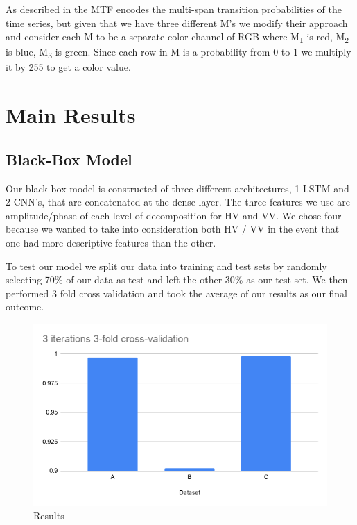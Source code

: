 \documentclass{turabian-thesis}
\begin{document}
As described in \cite{wang_encoding_nodate} the MTF encodes the multi-span transition probabilities of the time series, but given that we have three different M's we modify their approach and consider each M to be a separate color channel of RGB where M\textsubscript{1} is red, M\textsubscript{2} is blue, M\textsubscript{3} is green. Since each row in M is a probability from 0 to 1 we multiply it by 255 to get a color value.

\chapter{Main Results}
\label{chap:results}

\section{Black-Box Model}
Our black-box model is constructed of three different architectures, 1 LSTM and 2 CNN’s, that are concatenated at the dense layer. The three features we use are amplitude/phase of each level of decomposition for HV and VV. We chose four because we wanted to take into consideration both HV / VV in the event that one had more descriptive features than the other.

To test our model we split our data into training and test sets by randomly selecting 70\% of our data as test and left the other 30\% as our test set. We then performed 3 fold cross validation and took the average of our results as our final outcome.

\begin{figure}[h!]
   \begin{center}
      \includegraphics[scale=0.6]{../media/results.png}
   \end{center}
   \caption{Results}
   \label{fig:final_results}
\end{figure}
\end{document}
